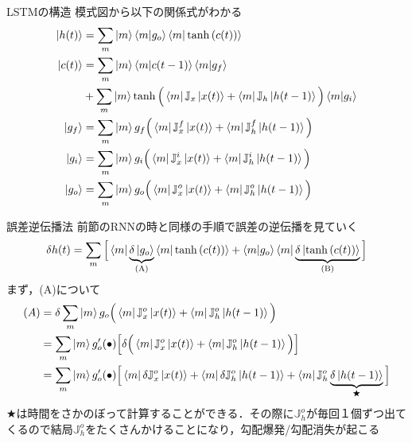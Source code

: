 \documentclass[dvipdfmx,8pt]{beamer}
\begin{document}
  \begin{frame}{LSTMの構造}
    模式図から以下の関係式がわかる
    \begin{align*}
      \ket{h(t)} &= \sum_{m}\ket{m}\braket{m|g_o}\braket{m|\tanh{(c(t))}}\\ 
      \ket{c(t)} &= \sum_{m}\ket{m}\braket{m|c(t-1)}\braket{m|g_f}\\
      &+ \sum_m \ket{m}\tanh{\Big( \bra{m}\mathbb{J}_x \ket{x(t)} + \bra{m}\mathbb{J}_h \ket{h(t-1)} \Big)}\braket{m|g_i}\\
      \ket{g_f}  &= \sum_{m}\ket{m}g_f\Big( \bra{m}\mathbb{J}^{f}_{x}\ket{x(t)} + \bra{m}\mathbb{J}^{f}_{h}\ket{h(t-1)} \Big)\\
      \ket{g_i}  &= \sum_{m}\ket{m}g_i\Big( \bra{m}\mathbb{J}^{i}_{x}\ket{x(t)} + \bra{m}\mathbb{J}^{i}_{h}\ket{h(t-1)} \Big)\\
      \ket{g_o}  &= \sum_{m}\ket{m}g_o\Big( \bra{m}\mathbb{J}^{o}_{x}\ket{x(t)} + \bra{m}\mathbb{J}^{o}_{h}\ket{h(t-1)} \Big)
    \end{align*}
  \end{frame}

  \begin{frame}[t]{誤差逆伝播法}
    前節のRNNの時と同様の手順で誤差の逆伝播を見ていく\\
    \begin{equation*}
      \delta{h(t)} = \sum_{m}\Big[ \bra{m}\underbrace{\delta\ket{g_o}}_{\text{(A)}}\braket{m|\tanh{(c(t))}} + \braket{m|g_o}\bra{m}\underbrace{\delta \ket{\tanh{(c(t))}}}_{\text{(B)}} \Big]
    \end{equation*}
    まず，(A)について
    \begin{align*}
      (A) 
      &= \delta \sum_{m}\ket{m}g_o\Big( \bra{m}\mathbb{J}^{o}_{x}\ket{x(t)} + \bra{m}\mathbb{J}^{o}_{h}\ket{h(t-1)} \Big)\\
      &= \sum_{m}\ket{m}g'_{o}(\bullet)\Big[ \delta \Big( \bra{m}\mathbb{J}^{o}_{x}\ket{x(t)} + \bra{m}\mathbb{J}^{o}_{h}\ket{h(t-1)} \Big) \Big]\\
      &= \sum_{m}\ket{m}g'_{o}(\bullet)\Big[ \bra{m}\delta\mathbb{J}^{o}_{x}\ket{x(t)} + \bra{m}\delta\mathbb{J}^{o}_{h}\ket{h(t-1)} + \bra{m}\mathbb{J}^{o}_{h}\underbrace{\delta\ket{h(t-1)}}_{\bigstar}  \Big]
    \end{align*}
    $\bigstar$は時間をさかのぼって計算することができる．その際に$\mathbb{J}^{o}_{h}$が毎回１個ずつ出てくるので結局$\mathbb{J}^{o}_{h}$をたくさんかけることになり，勾配爆発/勾配消失が起こる
  \end{frame}
\end{document}
